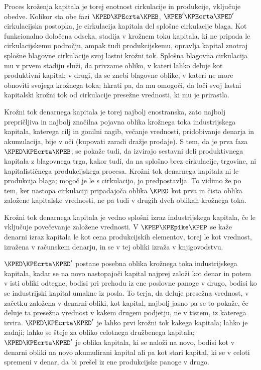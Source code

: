\documentclass[kapital_02.tex]{subfiles}
\begin{document}
Proces kroženja kapitala je torej enotnost cirkulacije in produkcije, vključuje obedve. Kolikor sta obe fazi \(\KPED\KPEcrta\KPEB\), \(\KPEB'\KPEcrta\KPED'\) cirkulacijska postopka, je cirkulacija kapitala del splošne cirkulacije blaga. Kot funkcionalno določena odseka, stadija v krožnem toku kapitala, ki ne pripada le cirkulacijskemu področju, ampak tudi produkcijskemu, opravlja kapital znotraj splošne blagovne cirkulacije svoj lastni krožni tok. Splošna blagovna cirkulacija mu v prvem stadiju služi, da privzame obliko, v kateri lahko deluje kot produktivni kapital; v drugi, da se znebi blagovne oblike, v kateri ne more obnoviti svojega krožnega toka; hkrati pa, da mu omogoči, da loči svoj lastni kapitalski krožni tok od cirkulacije presežne vrednosti, ki mu je prirastla.

Krožni tok denarnega kapitala je torej najbolj enostranska, zato najbolj prepričljiva in najbolj značilna pojavna oblika krožnega toka industrijskega kapitala, katerega cilj in gonilni nagib, večanje vrednosti, pridobivanje denarja in akumulacija, bije v oči (kupovati zaradi dražje prodaje). S tem, da je prva faza \(\KPED\KPEcrta\KPEB\), se pokaže tudi, da izvirajo sestavni deli produktivnega kapitala z blagovnega trga, kakor tudi, da na splošno brez cirkulacije, trgovine, ni kapitalističnega produkcijskega procesa. Krožni tok denarnega kapitala ni le produkcija blaga; mogoč je le s cirkulacijo, jo predpostavlja. To vidimo že po tem, ker nastopa cirkulaciji pripadajoča oblika \(\KPED\) kot prva in čista oblika založene kapitalske vrednosti, ne pa tudi v drugih dveh oblikah krožnega toka.

Krožni tok denarnega kapitala je vedno splošni izraz industrijskega kapitala, če le vključuje povečevanje založene vrednosti. V \(\KPEP\KPEpike\KPEP\) se kaže denarni izraz kapitala le kot cena produkcijskih elementov, torej le kot vrednost, izražena v računskem denarju, in se v tej obliki izraža v knjigovodstvu.

\(\KPED\KPEcrta\KPED'\) postane posebna oblika krožnega toka industrijskega kapitala, kadar se na novo nastopajoči kapital najprej \KPEstran založi kot denar in potem v isti obliki odtegne, bodisi pri prehodu iz ene poslovne panoge v drugo, bodisi ko se industrijski kapital umakne iz posla. To terja, da deluje presežna vrednost, v začetku založena v denarni obliki, kot kapital, najbolj jasno pa se to pokaže, če deluje ta presežna vrednost v kakem drugem podjetju, ne v tistem, iz katerega izvira. \(\KPED\KPEcrta\KPED'\) je lahko prvi krožni tok kakega kapitala; lahko je zadnji; lahko se šteje za obliko celotnega družbenega kapitala; \(\KPED\KPEcrta\KPED'\) je oblika kapitala, ki se naloži na novo, bodisi kot v denarni obliki na novo akumulirani kapital ali pa kot stari kapital, ki se v celoti spremeni v denar, da bi prešel iz ene produkcijske panoge v drugo.
\end{document}
